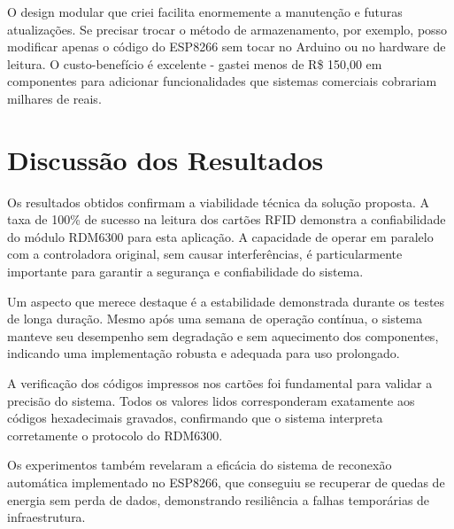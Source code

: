 O design modular que criei facilita enormemente a manutenção e futuras atualizações. Se precisar trocar o método de armazenamento, por exemplo, posso modificar apenas o código do ESP8266 sem tocar no Arduino ou no hardware de leitura. O custo-benefício é excelente - gastei menos de R\$ 150,00 em componentes para adicionar funcionalidades que sistemas comerciais cobrariam milhares de reais.

\section{Discussão dos Resultados}

Os resultados obtidos confirmam a viabilidade técnica da solução proposta. A taxa de 100\% de sucesso na leitura dos cartões RFID demonstra a confiabilidade do módulo RDM6300 para esta aplicação. A capacidade de operar em paralelo com a controladora original, sem causar interferências, é particularmente importante para garantir a segurança e confiabilidade do sistema.

Um aspecto que merece destaque é a estabilidade demonstrada durante os testes de longa duração. Mesmo após uma semana de operação contínua, o sistema manteve seu desempenho sem degradação e sem aquecimento dos componentes, indicando uma implementação robusta e adequada para uso prolongado.

A verificação dos códigos impressos nos cartões foi fundamental para validar a precisão do sistema. Todos os valores lidos corresponderam exatamente aos códigos hexadecimais gravados, confirmando que o sistema interpreta corretamente o protocolo do RDM6300.

Os experimentos também revelaram a eficácia do sistema de reconexão automática implementado no ESP8266, que conseguiu se recuperar de quedas de energia sem perda de dados, demonstrando resiliência a falhas temporárias de infraestrutura.


